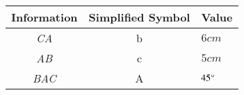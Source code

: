 \begin{tabular}[12pt]{|c|c|l|}
    \hline
	\textbf{Information} & \textbf{Simplified Symbol} & \textbf{Value}\\ 
    \hline
	\textit{CA} &b & $6cm$ \\
    \hline 
	\textit{AB} &c & $5cm$ \\
    \hline
	\textit{BAC} &A & $45\degree$ \\
    \hline   
    \end{tabular}

